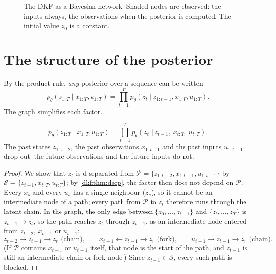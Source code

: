 \begin{notechapter}
\begin{figure}[ht]
\centering
{}
\caption{The DKF as a Bayesian network. Shaded nodes are observed: the inputs always, the
observations when the posterior is computed. The initial value $z_0$ is a constant.}
\label{dkf:fig:model}
\end{figure}

\section{The structure of the posterior}\label{dkf:sec:posterior}

By the product rule, \emph{any} posterior over a sequence can be written
\[
  p_\theta(z_{1:T}\mid x_{1:T}, u_{1:T}) = \prod_{t=1}^Tp_\theta(z_t\mid z_{1:t-1}, x_{1:T}, u_{1:T}) .
\]
The graph simplifies each factor.

\begin{proposition}\label{dkf:prop:posterior}
\[
  p_\theta(z_{1:T}\mid x_{1:T}, u_{1:T}) = \prod_{t=1}^Tp_\theta(z_t\mid z_{t-1},\ x_{t:T},\ u_{t:T}) .
\]
The past states $z_{1:t-2}$, the past observations $x_{1:t-1}$ and the past inputs $u_{1:t-1}$ drop out; the future
observations and the future inputs do not.
\end{proposition}

\begin{proof}
We show that $z_t$ is d-separated from $\mathcal P = \{z_{1:t-2}, x_{1:t-1}, u_{1:t-1}\}$ by $\mathcal S = \{z_{t-1}, x_{t:T}, u_{t:T}\}$; by
\cref{dkf:thm:dsep}, the factor then does not depend on $\mathcal P$. Every $x_s$ and every $u_s$ has a single
neighbour ($z_s$), so it cannot be an intermediate node of a path; every path from $\mathcal P$ to $z_t$
therefore runs through the latent chain. In the graph, the only edge between $\{z_0,\dots,z_{t-1}\}$ and
$\{z_t,\dots,z_T\}$ is $z_{t-1}\to z_t$, so the path reaches $z_t$ through $z_{t-1}$, as an intermediate node entered from $z_{t-2}$,
$x_{t-1}$ or $u_{t-1}$:
\[
  z_{t-2}\to z_{t-1}\to z_t\ \ \text{(chain)},\qquad x_{t-1}\leftarrow z_{t-1}\to z_t\ \ \text{(fork)},\qquad u_{t-1}\to z_{t-1}\to z_t\ \ \text{(chain)}.
\]
(If $\mathcal P$ contains $x_{t-1}$ or $u_{t-1}$ itself, that node is the start of the path, and $z_{t-1}$ is still an
intermediate chain or fork node.) Since $z_{t-1}\in\mathcal S$, every such path is blocked.


\end{proof}
\end{notechapter}
